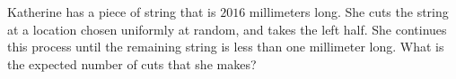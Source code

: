 Katherine has a piece of string that is $2016$ millimeters long. She cuts the string at a location chosen uniformly at random, and takes the left half. She continues this process until the remaining string is less than one millimeter long. What is the expected number of cuts that she makes?